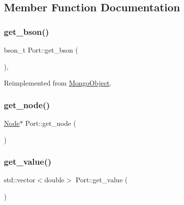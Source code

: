 \subsection{Member Function Documentation}
\mbox{\label{class_port_a746914b62d482cc81a901d254a03c560}} 
\subsubsection{\texorpdfstring{get\+\_\+bson()}{get\_bson()}}
{\footnotesize\ttfamily bson\+\_\+t Port\+::get\+\_\+bson (\begin{DoxyParamCaption}{ }\end{DoxyParamCaption})\hspace{0.3cm}{\ttfamily [final]}, {\ttfamily [virtual]}}



Reimplemented from \hyperlink{class_mongo_object_ac21cbe104a818f7e6ee7dcfbb521e9e1}{Mongo\+Object}.

\mbox{\label{class_port_a8659a2feee31ada701589c0fb4202b5b}} 
\subsubsection{\texorpdfstring{get\+\_\+node()}{get\_node()}}
{\footnotesize\ttfamily \hyperlink{class_node}{Node}$\ast$ Port\+::get\+\_\+node (\begin{DoxyParamCaption}{ }\end{DoxyParamCaption})\hspace{0.3cm}{\ttfamily [inline]}}

\mbox{\label{class_port_a82509b87aa9d775d0a40e2b446f2b7ad}} 
\subsubsection{\texorpdfstring{get\+\_\+value()}{get\_value()}\hspace{0.1cm}{\footnotesize\ttfamily [1/2]}}
{\footnotesize\ttfamily std\+::vector$<$double$>$ Port\+::get\+\_\+value (\begin{DoxyParamCaption}{ }\end{DoxyParamCaption})\hspace{0.3cm}{\ttfamily [inline]}}

